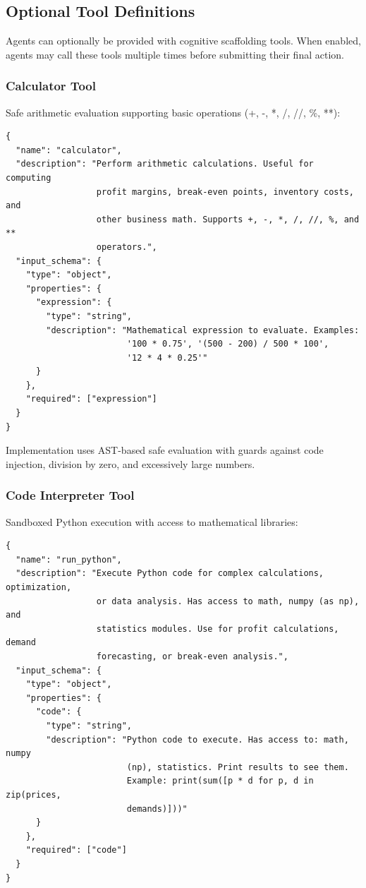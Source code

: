 \subsection{Optional Tool Definitions}

Agents can optionally be provided with cognitive scaffolding tools. When enabled, agents may call these tools multiple times before submitting their final action.

\subsubsection{Calculator Tool}

Safe arithmetic evaluation supporting basic operations (+, -, *, /, //, \%, **):

\begin{verbatim}
{
  "name": "calculator",
  "description": "Perform arithmetic calculations. Useful for computing 
                  profit margins, break-even points, inventory costs, and 
                  other business math. Supports +, -, *, /, //, %, and ** 
                  operators.",
  "input_schema": {
    "type": "object",
    "properties": {
      "expression": {
        "type": "string",
        "description": "Mathematical expression to evaluate. Examples: 
                        '100 * 0.75', '(500 - 200) / 500 * 100', 
                        '12 * 4 * 0.25'"
      }
    },
    "required": ["expression"]
  }
}
\end{verbatim}

Implementation uses AST-based safe evaluation with guards against code injection, division by zero, and excessively large numbers.

\subsubsection{Code Interpreter Tool}

Sandboxed Python execution with access to mathematical libraries:

\begin{verbatim}
{
  "name": "run_python",
  "description": "Execute Python code for complex calculations, optimization, 
                  or data analysis. Has access to math, numpy (as np), and 
                  statistics modules. Use for profit calculations, demand 
                  forecasting, or break-even analysis.",
  "input_schema": {
    "type": "object",
    "properties": {
      "code": {
        "type": "string",
        "description": "Python code to execute. Has access to: math, numpy 
                        (np), statistics. Print results to see them. 
                        Example: print(sum([p * d for p, d in zip(prices, 
                        demands)]))"
      }
    },
    "required": ["code"]
  }
}
\end{verbatim}

